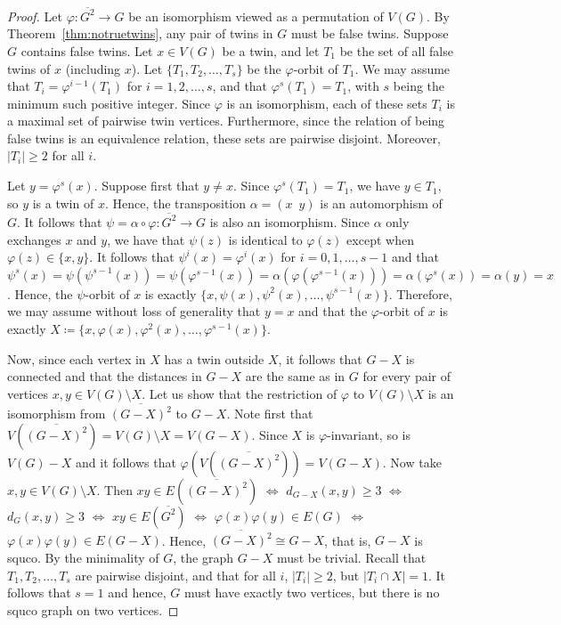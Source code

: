 \documentclass[10pt,a4paper]{amsart}
\newcommand{\sq}[1]{\overline{#1^2}}
\theoremstyle{plain}
\begin{document}
\begin{proof}
  Let $\varphi\colon \sq{G}\rightarrow G$ be an isomorphism viewed as a permutation of $V(G)$. 
  By Theorem~\ref{thm:notruetwins}, any pair of twins in $G$ must be false twins.  
  Suppose $G$ contains false twins.  
  Let $x\in V(G)$ be a twin, and let $T_1$ be the set of all false twins of $x$ (including $x$).  
  Let $\{T_{1}, T_{2}, \ldots, T_{s}\}$ be the $\varphi$-orbit of $T_{1}$. 
  We may assume that $T_{i} = \varphi^{i-1}(T_{1})$ for
  $i=1,2,\ldots, s$, and that $\varphi^{s}(T_{1}) = T_{1}$, with $s$ being the minimum such positive integer.  
  Since $\varphi$ is an isomorphism, each of these sets $T_{i}$ is a maximal set of pairwise twin vertices.
  Furthermore, since the relation of being false twins is an
  equivalence relation, these sets are pairwise disjoint. 
  Moreover, $|T_{i}|\geq 2$ for all $i$.

  Let $y=\varphi^s(x)$. 
  Suppose first that $y\neq x$.  
  Since $\varphi^{s}(T_{1}) = T_{1}$, we have $y\in T_{1}$, so $y$ is a twin of $x$.  
  Hence, the transposition $\alpha = (x\,\,\, y)$ is an automorphism of $G$.  
  It follows that $\psi = \alpha\circ \varphi \colon\sq{G} \rightarrow G$ is also an isomorphism. 
  Since $\alpha$ only exchanges $x$ and $y$, we have that $\psi(z)$ is identical to $\varphi(z)$ except when $\varphi(z)\in \{x,y\}$. 
  It follows that $\psi^{i}(x) = \varphi^{i}(x)$ for $i=0,1,\ldots, s-1$ and that $\psi^{s}(x) = \psi(\psi^{s-1}(x)) = \psi(\varphi^{s-1}(x)) = \alpha(\varphi(\varphi^{{s-1}}(x))) = \alpha(\varphi^{s}(x)) = \alpha(y) = x$. 
  Hence, the $\psi$-orbit of $x$ is exactly $\{x, \psi(x), \psi^2(x), \ldots, \psi^{s-1}(x)\}$.  
  Therefore, we may assume without loss of generality that $y=x$ and that the $\varphi$-orbit of $x$ is exactly
  $X \coloneqq\{x, \varphi(x), \varphi^2(x), \ldots, \varphi^{s-1}(x)\}$.

  Now, since each vertex in $X$ has a twin outside $X$, it follows that $G-X$ is connected and that the distances in $G-X$ are the same as in $G$ for every pair of vertices $x,y\in V(G) \setminus X$. 
  Let us show that the restriction of $\varphi$ to $V(G)\setminus X$ is an isomorphism from $\sq{(G-X)}$ to $G-X$. 
  Note first that $V\left(\sq{(G-X)}\right)=V(G) \setminus X =V(G-X)$. Since $X$ is $\varphi$-invariant, so is $V(G)-X$ and it follows that  $\varphi\left(V\left(\sq{(G-X)}\right)\right)=V(G-X)$. 
  Now take $x,y\in V(G) \setminus X$. 
  Then $xy\in E\left(\sq{(G-X)}\right)$ $\iff$
    $d_{G-X}(x,y)\geq 3$ $\iff$ $d_{G}(x,y)\geq 3$ $\iff$
        $xy\in E(\sq{G})$ $\iff$ $\varphi(x)\varphi(y)\in E(G)$ $\iff$
            $\varphi(x)\varphi(y)\in E(G-X)$.  
        Hence, $\sq{(G-X)}\cong G-X$, that is, $G-X$ is squco.  
        By the minimality of $G$, the graph $G-X$ must be trivial.  
        Recall that $T_{1}, T_{2},\ldots, T_{s}$ are pairwise disjoint, and that for all $i$, $|T_{i}|\geq 2$, but $|T_{i}\cap X| = 1$.  
            It follows that $s=1$ and hence, $G$            must have exactly two vertices, but there is no squco graph on two vertices.


\end{proof}
\end{document}
